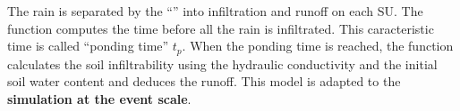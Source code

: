 The rain is separated by the ``\englishname'' into infiltration and runoff on each SU. The function computes the time before all the rain is infiltrated. This caracteristic time is called ``ponding time'' $t_p$. When the ponding time is reached, the function calculates the soil infiltrability using the hydraulic conductivity and the initial soil water content and deduces the runoff. This model is adapted to the \textbf{simulation at the event scale}.